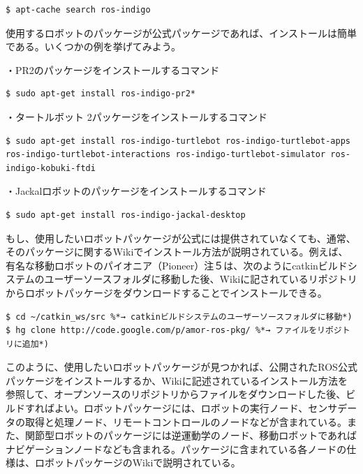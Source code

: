\begin{lstlisting}[language=ROS]
$ apt-cache search ros-indigo
\end{lstlisting}

使用するロボットのパッケージが公式パッケージであれば、インストールは簡単である。いくつかの例を挙げてみよう。

・PR2のパッケージをインストールするコマンド
\begin{lstlisting}[language=ROS]
$ sudo apt-get install ros-indigo-pr2*
\end{lstlisting}

・タートルボット 2パッケージをインストールするコマンド
\begin{lstlisting}[language=ROS]
$ sudo apt-get install ros-indigo-turtlebot ros-indigo-turtlebot-apps ros-indigo-turtlebot-interactions ros-indigo-turtlebot-simulator ros-indigo-kobuki-ftdi
\end{lstlisting}

・Jackalロボットのパッケージをインストールするコマンド
\begin{lstlisting}[language=ROS]
$ sudo apt-get install ros-indigo-jackal-desktop
\end{lstlisting}

もし、使用したいロボットパッケージが公式には提供されていなくても、通常、そのパッケージに関するWikiでインストール方法が説明されている。例えば、有名な移動ロボットのパイオニア（Pioneer）注５は、次のようにcatkinビルドシステムのユーザーソースフォルダに移動した後、Wikiに記されているリポジトリからロボットパッケージをダウンロードすることでインストールできる。

\begin{lstlisting}[language=ROS]
$ cd ~/catkin_ws/src %*→ catkinビルドシステムのユーザーソースフォルダに移動*)
$ hg clone http://code.google.com/p/amor-ros-pkg/ %*→ ファイルをリポジトリに追加*)
\end{lstlisting}

このように、使用したいロボットパッケージが見つかれば、公開されたROS公式パッケージをインストールするか、Wikiに記述されているインストール方法を参照して、オープンソースのリポジトリからファイルをダウンロードした後、ビルドすればよい。ロボットパッケージには、ロボットの実行ノード、センサデータの取得と処理ノード、リモートコントロールのノードなどが含まれている。また、関節型ロボットのパッケージには逆運動学のノード、移動ロボットであればナビゲーションノードなども含まれる。パッケージに含まれている各ノードの仕様は、ロボットパッケージのWikiで説明されている。

